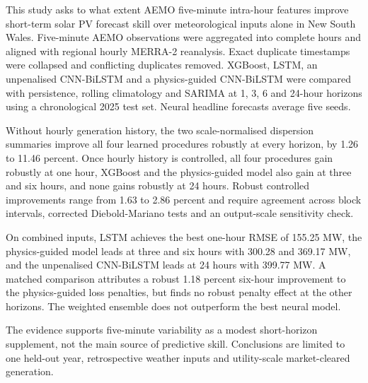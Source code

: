 This study asks to what extent AEMO five-minute intra-hour features improve short-term solar PV forecast skill over meteorological inputs alone in New South Wales. Five-minute AEMO observations were aggregated into complete hours and aligned with regional hourly MERRA-2 reanalysis. Exact duplicate timestamps were collapsed and conflicting duplicates removed. XGBoost, LSTM, an unpenalised CNN-BiLSTM and a physics-guided CNN-BiLSTM were compared with persistence, rolling climatology and SARIMA at 1, 3, 6 and 24-hour horizons using a chronological 2025 test set. Neural headline forecasts average five seeds.

Without hourly generation history, the two scale-normalised dispersion summaries improve all four learned procedures robustly at every horizon, by 1.26 to 11.46 percent. Once hourly history is controlled, all four procedures gain robustly at one hour, XGBoost and the physics-guided model also gain at three and six hours, and none gains robustly at 24 hours. Robust controlled improvements range from 1.63 to 2.86 percent and require agreement across block intervals, corrected Diebold-Mariano tests and an output-scale sensitivity check.

On combined inputs, LSTM achieves the best one-hour RMSE of 155.25 MW, the physics-guided model leads at three and six hours with 300.28 and 369.17 MW, and the unpenalised CNN-BiLSTM leads at 24 hours with 399.77 MW. A matched comparison attributes a robust 1.18 percent six-hour improvement to the physics-guided loss penalties, but finds no robust penalty effect at the other horizons. The weighted ensemble does not outperform the best neural model.

The evidence supports five-minute variability as a modest short-horizon supplement, not the main source of predictive skill. Conclusions are limited to one held-out year, retrospective weather inputs and utility-scale market-cleared generation.
